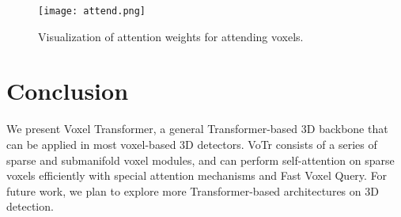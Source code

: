 \documentclass[10pt,twocolumn,letterpaper]{article}
\begin{document}
\begin{table}[]
\setlength{\belowcaptionskip}{10pt}
\caption{Comparisons on the model parameters for different frameworks on the KITTI dataset.} \label{table_ablation_4}
\vspace{-2mm}
\end{table}

\begin{table}[]
\setlength{\belowcaptionskip}{10pt}
\caption{Comparisons on the inference speeds for different frameworks on the KITTI dataset. 48 attending voxels are used.} \label{table_ablation_5}
\vspace{-2mm}
\end{table}

\begin{figure}[!t]
\centering
\texttt{[image: attend.png]}
\caption{Visualization of attention weights for attending voxels.}
\label{fig_weights}
\vspace{-2mm}
\end{figure}

\section{Conclusion}
We present Voxel Transformer, a general Transformer-based 3D backbone that can be applied in most voxel-based 3D detectors. VoTr consists of a series of sparse and submanifold voxel modules, and can perform self-attention on sparse voxels efficiently with special attention mechanisms and Fast Voxel Query. For future work, we plan to explore more Transformer-based architectures on 3D detection.
\end{document}
